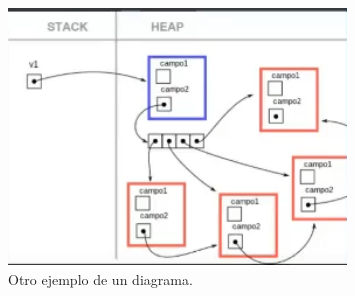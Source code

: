 \documentclass[titlepage,a4paper]{article}
\begin{document}
\begin{figure}[H]
\centering
\includegraphics[width=0.8\textwidth]{diagrama2.png}
\caption{\label{fig:seq02}Otro ejemplo de un diagrama.}
\end{figure}
\end{document}
